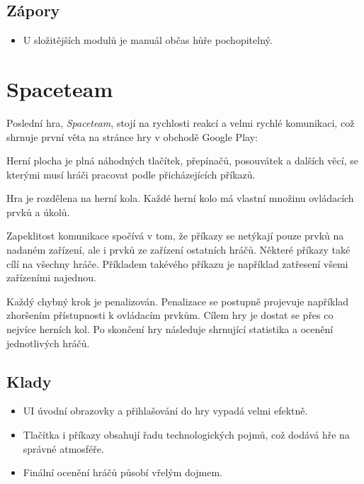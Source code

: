 \subsection*{Zápory}

\begin{itemize}
    \item U složitějších modulů je manuál občas hůře pochopitelný.
\end{itemize}

\section{Spaceteam}

Poslední hra, \emph{Spaceteam}, stojí na rychlosti reakcí a velmi rychlé
komunikaci, což shrnuje první věta na stránce hry \cite{henrysmithinc_spaceteam}
v obchodě Google Play: 

Herní plocha je plná náhodných tlačítek, přepínačů, posouvátek a dalších věcí,
se kterými musí hráči pracovat podle přicházejících příkazů.

Hra je rozdělena na herní kola.
Každé herní kolo má vlastní množinu ovládacích prvků a úkolů.

Zapeklitost komunikace spočívá v tom,
že příkazy se netýkají pouze prvků na nadaném zařízení,
ale i prvků ze zařízení ostatních hráčů.
Některé příkazy také cílí na všechny hráče.
Příkladem takévého příkazu je například zatřesení všemi zařízeními najednou.

Každý chybný krok je penalizován.
Penalizace se postupně projevuje například zhoršením přístupnosti k ovládacím
prvkům.
Cílem hry je dostat se přes co nejvíce herních kol.
Po skončení hry následuje shrnující statistika a ocenění jednotlivých hráčů.

\FloatBarrier

\subsection*{Klady}

\begin{itemize}
    \item UI úvodní obrazovky a přihlašování do hry vypadá velmi efektně.
    \item Tlačítka i příkazy obsahují řadu technologických pojmů,
což dodává hře na správné atmosféře.
    \item Finální ocenění hráčů působí vřelým dojmem.
\end{itemize}

